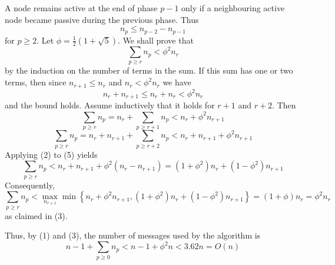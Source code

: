 \documentclass{article}
\begin{document}
A node remains active at the end of phase $p-1$ only if a neighbouring active node became passive during the previous phase. Thus
\begin{equation}
n_p \leqslant n_{p-2} - n_{p-1}
\end{equation}
for $p\geqslant 2$. Let $\phi = \frac{1}{2}\left( 1+\sqrt{5} \right)$. We shall prove that
\begin{equation}
\sum_{p\geqslant r} n_p < \phi^{2} n_r
\end{equation}
by the induction on the number of terms in the sum. If this sum has one or two terms, then since $n_{r+1}\leqslant n_r$ and $n_r<\phi^{2}n_r$ we have
$$n_r + n_{r+1}\leqslant n_r + n_r < \phi^{2}n_r$$
and the bound holds. Assume inductively that it holds for $r+1$ and $r+2$. Then
\begin{equation}
\sum_{p\geqslant r}n_p = n_r + \sum_{p\geqslant r+1}n_p < n_r+\phi^{2}n_{r+1}
\end{equation}
\begin{equation}
\sum_{p\geqslant r}n_p = n_r + n_{r+1} + \sum_{p\geqslant r+2}n_p < n_r + n_{r+1} + \phi^{2}n_{r+1}
\end{equation}
Applying (2) to (5) yields
\begin{equation}
\sum_{p\geqslant r}n_p < n_r + n_{r+1} + \phi^{2} \left( n_r - n_{r+1} \right) = \left( 1+\phi^{2} \right) n_r + \left( 1-\phi^{2} \right)n_{r+1}
\end{equation}
Consequently,
$$\sum_{p\geqslant r}n_p < \max_{n_{r+1}}\min \left\{ n_r+\phi^{2}n_{r+1}, \left( 1+\phi^{2} \right)n_r + \left( 1-\phi^{2} \right)n_{r+1} \right\} = \left( 1+\phi \right)n_r=\phi^{2}n_r$$
as claimed in (3).

Thus, by (1) and (3), the number of messages used by the algorithm is
$$n-1+\sum_{p\geqslant 0}n_p<n-1+\phi^{2}n<3.62n=O(n)$$



\end{document}

